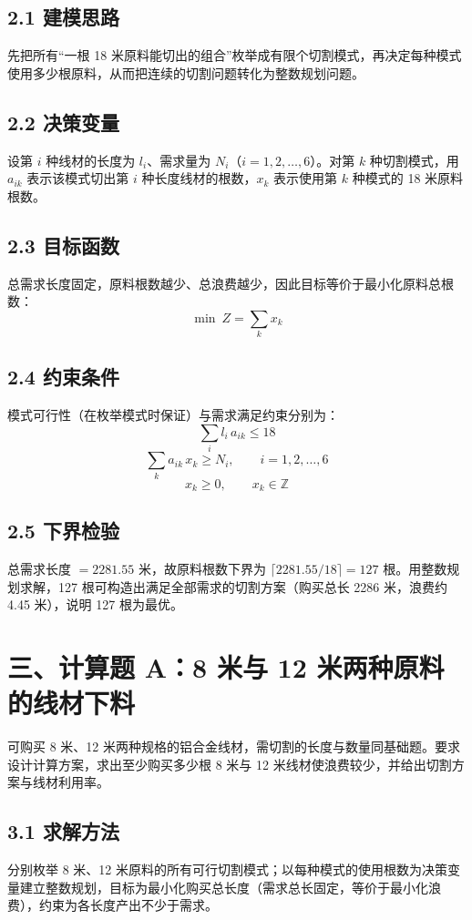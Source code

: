 \documentclass[12pt,a4paper]{ctexart}
\begin{document}
\subsection{2.1 建模思路}
先把所有“一根 18 米原料能切出的组合”枚举成有限个切割模式，再决定每种模式使用多少根原料，从而把连续的切割问题转化为整数规划问题。

\subsection{2.2 决策变量}
设第 $i$ 种线材的长度为 $l_i$、需求量为 $N_i$（$i=1,2,\dots,6$）。对第 $k$ 种切割模式，用 $a_{ik}$ 表示该模式切出第 $i$ 种长度线材的根数，$x_k$ 表示使用第 $k$ 种模式的 18 米原料根数。

\subsection{2.3 目标函数}
总需求长度固定，原料根数越少、总浪费越少，因此目标等价于最小化原料总根数：
\[
\min\ Z=\sum_{k} x_k
\]

\subsection{2.4 约束条件}
模式可行性（在枚举模式时保证）与需求满足约束分别为：
\[
\sum_{i} l_i\,a_{ik}\le 18
\]
\[
\sum_{k} a_{ik}\,x_k\ge N_i,\qquad i=1,2,\dots,6
\]
\[
x_k\ge 0,\qquad x_k\in\mathbb{Z}
\]

\subsection{2.5 下界检验}
总需求长度 $=2281.55$ 米，故原料根数下界为 $\lceil 2281.55/18\rceil=127$ 根。用整数规划求解，127 根可构造出满足全部需求的切割方案（购买总长 2286 米，浪费约 4.45 米），说明 127 根为最优。

\section{三、计算题 A：8 米与 12 米两种原料的线材下料}

可购买 8 米、12 米两种规格的铝合金线材，需切割的长度与数量同基础题。要求设计计算方案，求出至少购买多少根 8 米与 12 米线材使浪费较少，并给出切割方案与线材利用率。

\subsection{3.1 求解方法}
分别枚举 8 米、12 米原料的所有可行切割模式；以每种模式的使用根数为决策变量建立整数规划，目标为最小化购买总长度（需求总长固定，等价于最小化浪费），约束为各长度产出不少于需求。
\end{document}
